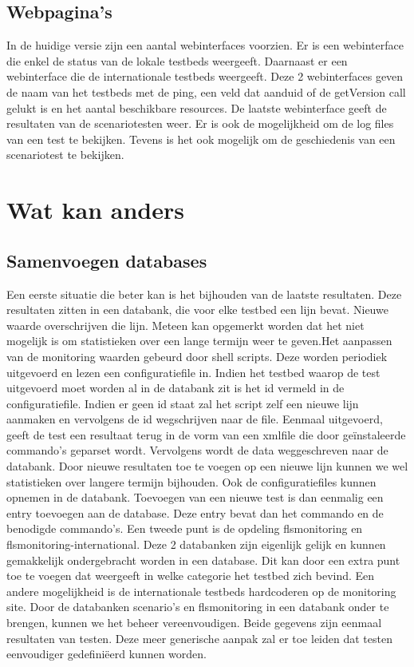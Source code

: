 \subsection{Webpagina\rq s}
\npar
In de huidige versie zijn een aantal webinterfaces voorzien. 
Er is een webinterface die enkel de status van de lokale testbeds weergeeft. Daarnaast er een webinterface die de internationale testbeds weergeeft. 
Deze 2 webinterfaces geven de naam van het testbeds met de ping, een veld dat aanduid of de getVersion call gelukt is en het aantal beschikbare resources.
\npar
De laatste webinterface geeft de resultaten van de scenariotesten weer. Er is ook de mogelijkheid om de log files van een test te bekijken. Tevens is het ook mogelijk om de geschiedenis van een scenariotest te bekijken.
\section{Wat kan anders}
\subsection{Samenvoegen databases}
\npar
Een eerste situatie die beter kan is het bijhouden van de laatste resultaten.
Deze resultaten zitten in een databank, die voor elke testbed een lijn bevat. Nieuwe waarde overschrijven die lijn. Meteen kan opgemerkt worden dat het niet mogelijk is om statistieken over een lange termijn weer te geven.Het aanpassen van de monitoring waarden gebeurd door shell scripts. Deze worden periodiek uitgevoerd en lezen een configuratiefile in. Indien het testbed waarop de test uitgevoerd moet worden al in de databank zit is het id vermeld in de configuratiefile. Indien er geen id staat zal het script zelf een nieuwe lijn aanmaken en vervolgens de id wegschrijven naar de file. Eenmaal uitgevoerd, geeft de test een resultaat terug in de vorm van een xmlfile die door ge\"instaleerde commando\rq s geparset wordt. Vervolgens wordt de data weggeschreven naar de databank.
\npar
Door nieuwe resultaten toe te voegen op een nieuwe lijn kunnen we wel statistieken over langere termijn bijhouden.
Ook de configuratiefiles kunnen opnemen in de databank. Toevoegen van een nieuwe test is dan eenmalig een entry toevoegen aan de database.
Deze entry bevat dan het commando en de benodigde commando's.
\npar
Een tweede punt is de opdeling flsmonitoring en flsmonitoring-international. Deze 2 databanken zijn eigenlijk gelijk en kunnen gemakkelijk ondergebracht worden in een database.
Dit kan door een extra punt toe te voegen dat weergeeft in welke categorie het testbed zich bevind. Een andere mogelijkheid is de internationale testbeds hardcoderen op de monitoring site.
\npar
Door de databanken scenario\rq s en flsmonitoring in een databank onder te brengen, kunnen we het beheer vereenvoudigen.
Beide gegevens zijn eenmaal resultaten van testen. Deze meer generische aanpak zal er toe leiden dat testen eenvoudiger gedefini\"eerd kunnen worden.

